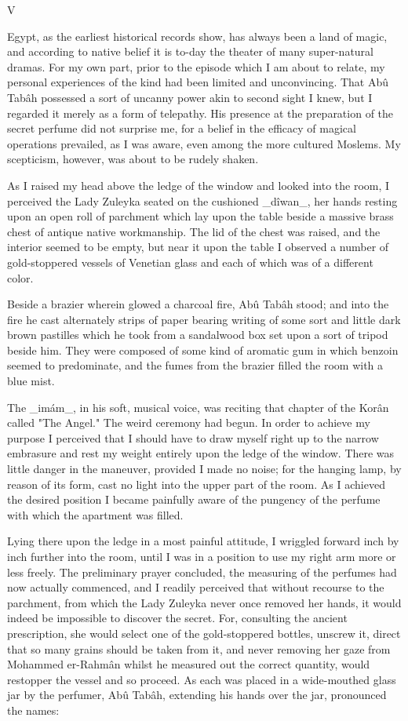 V

Egypt, as the earliest historical records show, has always been a land
of magic, and according to native belief it is to-day the theater of
many super-natural dramas. For my own part, prior to the episode which
I am about to relate, my personal experiences of the kind had been
limited and unconvincing. That Abû Tabâh possessed a sort of uncanny
power akin to second sight I knew, but I regarded it merely as a form
of telepathy. His presence at the preparation of the secret perfume
did not surprise me, for a belief in the efficacy of magical
operations prevailed, as I was aware, even among the more cultured
Moslems. My scepticism, however, was about to be rudely shaken.

As I raised my head above the ledge of the window and looked into the
room, I perceived the Lady Zuleyka seated on the cushioned _dîwan_,
her hands resting upon an open roll of parchment which lay upon the
table beside a massive brass chest of antique native workmanship. The
lid of the chest was raised, and the interior seemed to be empty, but
near it upon the table I observed a number of gold-stoppered vessels
of Venetian glass and each of which was of a different color.

Beside a brazier wherein glowed a charcoal fire, Abû Tabâh stood;
and into the fire he cast alternately strips of paper bearing writing
of some sort and little dark brown pastilles which he took from
a sandalwood box set upon a sort of tripod beside him. They were
composed of some kind of aromatic gum in which benzoin seemed to
predominate, and the fumes from the brazier filled the room with
a blue mist.

The _imám_, in his soft, musical voice, was reciting that chapter of
the Korân called "The Angel." The weird ceremony had begun. In order
to achieve my purpose I perceived that I should have to draw myself
right up to the narrow embrasure and rest my weight entirely upon the
ledge of the window. There was little danger in the maneuver, provided
I made no noise; for the hanging lamp, by reason of its form, cast no
light into the upper part of the room. As I achieved the desired
position I became painfully aware of the pungency of the perfume with
which the apartment was filled.

Lying there upon the ledge in a most painful attitude, I wriggled
forward inch by inch further into the room, until I was in a position
to use my right arm more or less freely. The preliminary prayer
concluded, the measuring of the perfumes had now actually commenced,
and I readily perceived that without recourse to the parchment, from
which the Lady Zuleyka never once removed her hands, it would indeed
be impossible to discover the secret. For, consulting the ancient
prescription, she would select one of the gold-stoppered bottles,
unscrew it, direct that so many grains should be taken from it, and
never removing her gaze from Mohammed er-Rahmân whilst he measured
out the correct quantity, would restopper the vessel and so proceed.
As each was placed in a wide-mouthed glass jar by the perfumer, Abû
Tabâh, extending his hands over the jar, pronounced the names:

